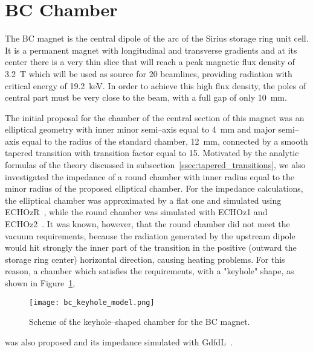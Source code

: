 \section{BC Chamber}\label{sec:bc_chamber}

    The BC magnet is the central dipole of the arc of the Sirius storage ring unit cell. It is a permanent magnet with longitudinal and transverse gradients and at its center there is a very thin slice that will reach a peak magnetic flux density of \SI{3.2}{\tesla} which will be used as source for 20 beamlines, providing radiation with critical energy of \SI{19.2}{\kilo\electronvolt}. In order to achieve this high flux density, the poles of central part must be very close to the beam, with a full gap of only \SI{10}{\milli\meter}.

    The initial proposal for the chamber of the central section of this magnet was an elliptical geometry with inner minor semi--axis equal to \SI{4}{\milli\meter} and major semi--axis equal to the radius of the standard chamber, \SI{12}{\milli\meter}, connected by a smooth tapered transition with transition factor equal to 15. Motivated by the analytic formulas of the theory discussed in subsection~\ref{ssec:tapered_transitions}, we also investigated the impedance of a round chamber with inner radius equal to the minor radius of the proposed elliptical chamber. For the impedance calculations, the elliptical chamber was approximated by a flat one and simulated using ECHOzR~\cite{Zagorodnov2015}, while the round chamber was simulated with ECHOz1 and ECHOz2~\cite{Zagorodnov2005}. It was known, however, that the round chamber did not meet the vacuum requirements, because the radiation generated by the upstream dipole would hit strongly the inner part of the transition in the positive (outward the storage ring center) horizontal direction, causing heating problems. For this reason, a chamber which satisfies the requirements, with a "keyhole" shape, as shown in Figure~\ref{fig:bc_keyhole_model},
    \begin{figure}
        \centering
        \texttt{[image: bc\_keyhole\_model.png]}
        \caption{Scheme of the keyhole--shaped chamber for the BC magnet.}
        \label{fig:bc_keyhole_model}
    \end{figure}
    was also proposed and its impedance simulated with GdfdL~\cite{Bruns2017}.

